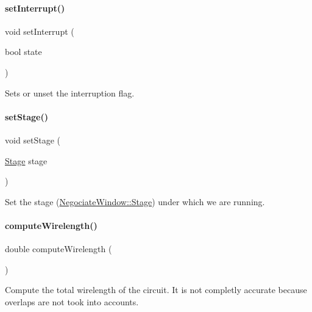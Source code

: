 \paragraph{\texorpdfstring{set\+Interrupt()}{setInterrupt()}}
{\footnotesize\ttfamily void set\+Interrupt (\begin{DoxyParamCaption}\item[{bool}]{state }\end{DoxyParamCaption})\hspace{0.3cm}{\ttfamily [inline]}}

Sets or unset the interruption flag. \mbox{\label{classKite_1_1NegociateWindow_aad6b43971b936f7ea003d3ad0fd07532}} 
\paragraph{\texorpdfstring{set\+Stage()}{setStage()}}
{\footnotesize\ttfamily void set\+Stage (\begin{DoxyParamCaption}\item[{\hyperlink{classKite_1_1NegociateWindow_aca8133200c1122e29b87b314d82604eb}{Stage}}]{stage }\end{DoxyParamCaption})\hspace{0.3cm}{\ttfamily [inline]}}

Set the stage (\hyperlink{classKite_1_1NegociateWindow_aca8133200c1122e29b87b314d82604eb}{Negociate\+Window\+::\+Stage}) under which we are running. \mbox{\label{classKite_1_1NegociateWindow_a4936106670361df6b6f3ef0b6088c9dc}} 
\paragraph{\texorpdfstring{compute\+Wirelength()}{computeWirelength()}}
{\footnotesize\ttfamily double compute\+Wirelength (\begin{DoxyParamCaption}{ }\end{DoxyParamCaption})}

Compute the total wirelength of the circuit. It is not completly accurate because overlaps are not took into accounts. \mbox{\label{classKite_1_1NegociateWindow_a7bf31fcd4e4007e62454689ef7c553fc}} 
